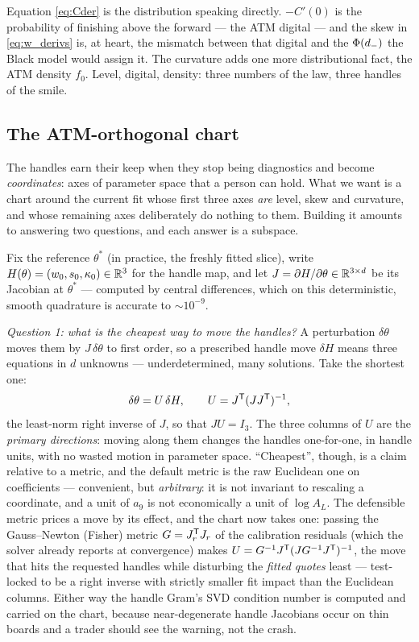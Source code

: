 \documentclass[11pt]{article}
\begin{document}
\begin{heuristic}
Equation \eqref{eq:Cder} is the distribution speaking directly.  $-C'(0)$ is
the probability of finishing above the forward --- the ATM digital --- and
the skew in \eqref{eq:w_derivs} is, at heart, the mismatch between that
digital and the $\Phi(d_-)$ the Black model would assign it.  The curvature
adds one more distributional fact, the ATM density $f_0$.  Level, digital,
density: three numbers of the law, three handles of the smile.
\end{heuristic}

\subsection{The ATM-orthogonal chart}
\label{sec:ortho}

The handles earn their keep when they stop being diagnostics and become
\emph{coordinates}: axes of parameter space that a person can hold.  What we
want is a chart around the current fit whose first three axes \emph{are}
level, skew and curvature, and whose remaining axes deliberately do nothing
to them.  Building it amounts to answering two questions, and each answer is
a subspace.

Fix the reference $\theta^{*}$ (in practice, the freshly fitted slice),
write $H(\theta)=(w_0,s_0,\kappa_0)\in\mathbb{R}^{3}$ for the handle map, and let
$J=\partial H/\partial\theta\in\mathbb{R}^{3\times d}$ be its Jacobian at
$\theta^{*}$ --- computed by central differences, which on this
deterministic, smooth quadrature is accurate to $\sim10^{-9}$.

\emph{Question 1: what is the cheapest way to move the handles?}  A
perturbation $\delta\theta$ moves them by $J\,\delta\theta$ to first order,
so a prescribed handle move $\delta H$ means three equations in $d$
unknowns --- underdetermined, many solutions.  Take the shortest one:
\begin{equation}
\delta\theta=U\,\delta H,
\qquad
U=J^{\mathsf{T}}(JJ^{\mathsf{T}})^{-1},
\label{eq:primary_dirs}
\end{equation}
the least-norm right inverse of $J$, so that $JU=I_3$.  The three columns
of $U$ are the \emph{primary directions}: moving along them changes the
handles one-for-one, in handle units, with no wasted motion in parameter
space.  ``Cheapest'', though, is a claim relative to a metric, and the
default metric is the raw Euclidean one on coefficients --- convenient, but
\emph{arbitrary}: it is not invariant to rescaling a coordinate, and a unit
of $a_9$ is not economically a unit of $\log A_L$.  The defensible metric
prices a move by its effect, and the chart now takes one: passing the
Gauss--Newton (Fisher) metric $G=J_r^{\mathsf{T}} J_r$ of the calibration residuals
(which the solver already reports at convergence) makes
$U=G^{-1}J^{\mathsf{T}}(JG^{-1}J^{\mathsf{T}})^{-1}$, the move that hits the requested handles
while disturbing the \emph{fitted quotes} least --- test-locked to be a
right inverse with strictly smaller fit impact than the Euclidean columns.
Either way the handle Gram's SVD condition number is computed and carried
on the chart, because near-degenerate handle Jacobians occur on thin
boards and a trader should see the warning, not the crash.
\end{document}
